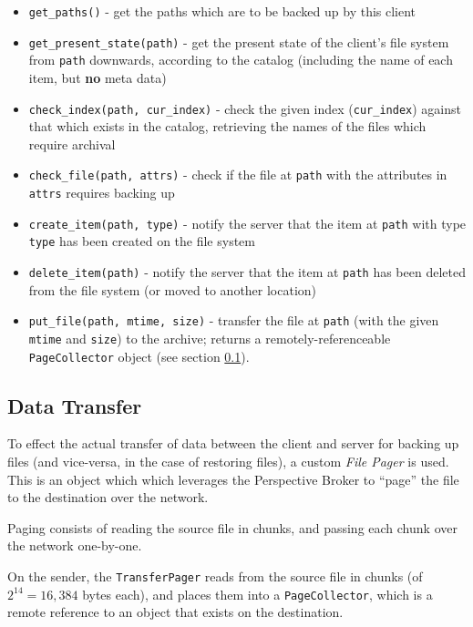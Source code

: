 \begin{itemize}
    \item \verb!get_paths()! - get the paths which are to be backed up by this
        client
    \item \verb!get_present_state(path)! - get the present state of the
        client's file system from \verb!path! downwards, according to the
        catalog (including the name of each item, but \textbf{no} meta data)
    \item \verb!check_index(path, cur_index)! - check the given index
        (\verb!cur_index!) against that which exists in the catalog, retrieving
        the names of the files which require archival
    \item \verb!check_file(path, attrs)! - check if the file at \verb!path!
        with the attributes in \verb!attrs! requires backing up
    \item \verb!create_item(path, type)! - notify the server that the item at
        \verb!path! with type \verb!type! has been created on the file system
    \item \verb!delete_item(path)! - notify the server that the item at
        \verb!path! has been deleted from the file system (or moved to another
        location)
    \item \verb!put_file(path, mtime, size)! - transfer the file at \verb!path!
        (with the given \verb!mtime! and \verb!size!) to the archive; returns
        a remotely-referenceable \verb!PageCollector! object (see section
        \ref{sec:data-transfer}).
\end{itemize}

\subsection{Data Transfer}
\label{sec:data-transfer}

To effect the actual transfer of data between the client and server for backing
up files (and vice-versa, in the case of restoring files), a custom \emph{File
Pager} is used. This is an object which which leverages the Perspective Broker
to ``page'' the file to the destination over the network.

Paging consists of reading the source file in chunks, and passing each chunk
over the network one-by-one.

On the sender, the \verb!TransferPager! reads from the source file in chunks
(of $2^{14} = 16,384$ bytes each), and places them into a \verb!PageCollector!,
which is a remote reference to an object that exists on the destination.

